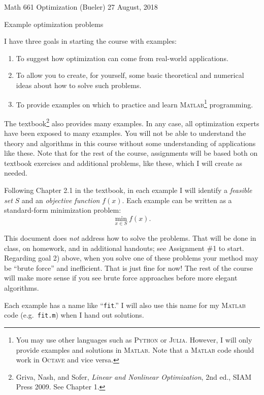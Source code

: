 \documentclass[11pt]{amsart}
\newcommand{\Julia}{\textsc{Julia}\xspace}
\newcommand{\Matlab}{\textsc{Matlab}\xspace}
\newcommand{\Octave}{\textsc{Octave}\xspace}
\newcommand{\Python}{\textsc{Python}\xspace}
\begin{document}
\scriptsize \noindent Math 661 Optimization (Bueler) \hfill 27 August, 2018
\normalsize

\medskip\bigskip
\Large
\centerline{Example optimization problems}

\bigskip\medskip
\normalsize

\thispagestyle{empty}

I have three goals in starting the course with examples:
\renewcommand{\labelenumi}{\arabic{enumi})}
\begin{enumerate}
\item To suggest how optimization can come from real-world applications.
\item To allow you to create, for yourself, some basic theoretical and numerical ideas about how to solve such problems.
\item To provide examples on which to practice and learn \Matlab\footnote{You may use other languages such as \Python or \Julia.  However, I will only provide examples and solutions in \Matlab.  Note that a \Matlab code should work in \Octave and vice versa.} programming.
\end{enumerate}

The textbook\footnote{Griva, Nash, and Sofer, \emph{Linear and Nonlinear Optimization}, 2nd ed., SIAM Press 2009.  See Chapter 1.} also provides many examples.  In any case, all optimization experts have been exposed to many examples.  You will not be able to understand the theory and algorithms in this course without some understanding of applications like these.  Note that for the rest of the course, assignments will be based both on textbook exercises and additional problems, like these, which I will create as needed.

Following Chapter 2.1 in the textbook, in each example I will identify a \emph{feasible set} $S$ and an \emph{objective function} $f(x)$.  Each example can be written as a standard-form minimization problem:
    $$\min_{x\in S} f(x).$$

This document does \emph{not} address how to solve the problems.  That will be done in class, on homework, and in additional handouts; see Assignment \#1 to start.  Regarding goal 2) above, when you solve one of these problems your method may be ``brute force'' and inefficient.  That is just fine for now!  The rest of the course will make more sense if you see brute force approaches before more elegant algorithms.

Each example has a name like ``\texttt{fit}.''  I will also use this name for my \Matlab code (e.g.~\texttt{fit.m}) when I hand out solutions.
\end{document}
